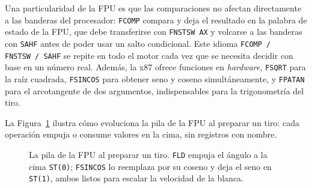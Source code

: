 \documentclass[a4paper,12pt]{article}
\begin{document}
Una particularidad de la FPU es que las comparaciones no afectan directamente a las banderas del procesador: \texttt{FCOMP} compara y deja el resultado en la palabra de estado de la FPU, que debe transferirse con \texttt{FNSTSW AX} y volcarse a las banderas con \texttt{SAHF} antes de poder usar un salto condicional. Este idioma \texttt{FCOMP\,/\,FNSTSW\,/\,SAHF} se repite en todo el motor cada vez que se necesita decidir con base en un número real. Además, la x87 ofrece funciones en \textit{hardware}, \texttt{FSQRT} para la raíz cuadrada, \texttt{FSINCOS} para obtener seno y coseno simultáneamente, y \texttt{FPATAN} para el arcotangente de dos argumentos, indispensables para la trigonometría del tiro.

La Figura~\ref{fig:pilafpu} ilustra cómo evoluciona la pila de la FPU al preparar un tiro: cada operación empuja o consume valores en la cima, sin registros con nombre.

\begin{figure}[H]
\centering
{}
\caption{La pila de la FPU al preparar un tiro. \texttt{FLD} empuja el ángulo a la cima \texttt{ST(0)}; \texttt{FSINCOS} lo reemplaza por su coseno y deja el seno en \texttt{ST(1)}, ambos listos para escalar la velocidad de la blanca.}
\label{fig:pilafpu}
\end{figure}
\end{document}
